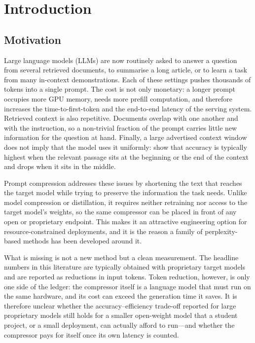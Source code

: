 ﻿\documentclass[10pt,a4paper,twocolumn]{article}
\begin{document}
\section{Introduction}

\subsection{Motivation}

Large language models (LLMs) are now routinely asked to answer a question from
several retrieved documents, to summarise a long article, or to learn a task from
many in-context demonstrations. Each of these settings pushes thousands of tokens
into a single prompt. The cost is not only monetary: a longer prompt occupies more
GPU memory, needs more prefill computation, and therefore increases the
time-to-first-token and the end-to-end latency of the serving system. Retrieved
context is also repetitive. Documents overlap with one another and with the
instruction, so a non-trivial fraction of the prompt carries little new
information for the question at hand. Finally, a large advertised context window
does not imply that the model uses it uniformly: \citet{liu-etal-2024-lost} show
that accuracy is typically highest when the relevant passage sits at the
beginning or the end of the context and drops when it sits in the middle.

Prompt compression addresses these issues by shortening the text that reaches the
target model while trying to preserve the information the task needs. Unlike
model compression or distillation, it requires neither retraining nor access to
the target model's weights, so the same compressor can be placed in front of any
open or proprietary endpoint. This makes it an attractive engineering option for
resource-constrained deployments, and it is the reason a family of
perplexity-based methods has been developed around it.

What is missing is not a new method but a clean measurement. The headline numbers
in this literature are typically obtained with proprietary target models and are
reported as reductions in input tokens. Token reduction, however, is only one side
of the ledger: the compressor itself is a language model that must run on the same
hardware, and its cost can exceed the generation time it saves. It is therefore
unclear whether the accuracy--efficiency trade-off reported for large proprietary
models still holds for a smaller open-weight model that a student project, or a
small deployment, can actually afford to run---and whether the compressor pays for
itself once its own latency is counted.
\end{document}
